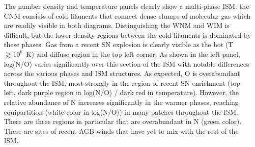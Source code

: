 \documentclass[twocolumn]{aastex61}
\begin{document}


%

The number density and temperature panels clearly show a multi-phase ISM: the CNM consists of cold filaments that connect dense clumps of molecular gas which are readily visible in both diagrams. Distinguishing the WNM and WIM is difficult, but the lower density regions between the cold filaments is dominated by these phases. Gas from a recent SN explosion is clearly visible as the hot (T~$\gtrsim 10^{6}$~K) and diffuse region in the top left corner. As shown in the left panel, log(N/O) varies significantly over this section of the ISM with notable differences across the various phases and ISM structures. As expected, O is overabundant throughout the ISM, most strongly in the region of recent SN enrichment (top left, dark purple region in log(N/O) / dark red in temperature). However, the relative abundance of N increases significantly in the warmer phases, reaching equipartition (white color in log(N/O)) in many patches throughout the ISM. There are three regions in particular that are overabundant in N (green color). These are sites of recent AGB winds that have yet to mix with the rest of the ISM. 
\end{document}
